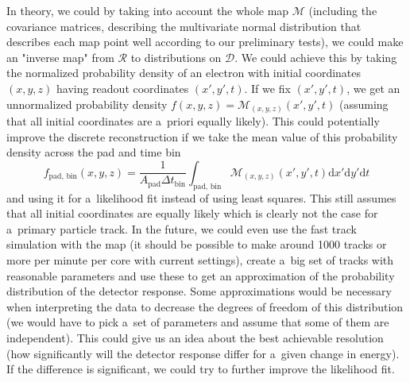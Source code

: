 \begin{itemize}
			In theory, we could by taking into account the whole map $\mathcal{M}$ (including the covariance matrices, describing the multivariate normal distribution that describes each map point well according to our preliminary tests), we could make an "inverse map" from $\mathcal{R}$ to distributions on $\mathcal{D}$. We could achieve this by taking the normalized probability density of an electron with initial coordinates $(x,y,z)$ having readout coordinates $(x',y',t)$. If we fix $(x',y',t)$, we get an unnormalized probability density $f(x,y,z) = \mathcal{M}_{(x,y,z)}(x',y',t)$ (assuming that all initial coordinates are a~priori equally likely). This could potentially improve the discrete reconstruction if we take the mean value of this probability density across the pad and time bin
			\begin{equation}
				f_\text{pad, bin}(x,y,z) = \frac{1}{A_\text{pad} \Delta t_\text{bin}} \int_\text{pad, bin} \mathcal{M}_{(x,y,z)}(x',y',t) 	\text{d}x'\text{d}y'\text{d}t
			\end{equation}
			and using it for a~likelihood fit instead of using least squares. This still assumes that all initial coordinates are equally likely which is clearly not the case for a~primary particle track. In the future, we could even use the fast track simulation with the map (it should be possible to make around 1000 tracks or more per minute per core with current settings), create a~big set of tracks with reasonable parameters and use these to get an approximation of the probability distribution of the detector response. Some approximations would be necessary when interpreting the data to decrease the degrees of freedom of this distribution (we would have to pick a~set of parameters and assume that some of them are independent). This could give us an idea about the best achievable resolution (how significantly will the detector response differ for a~given change in energy). If the difference is significant, we could try to further improve the likelihood fit.
		\end{itemize}
